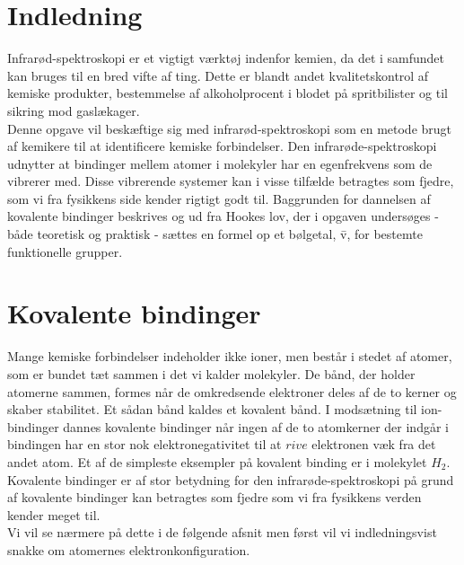 \chapter*{Indledning}
Infrarød-spektroskopi er et vigtigt værktøj indenfor kemien, da det i samfundet kan bruges til en bred vifte af ting. Dette er blandt andet kvalitetskontrol af kemiske produkter, bestemmelse af alkoholprocent i blodet på spritbilister og til sikring mod gaslækager. 
\\

Denne opgave vil beskæftige sig med infrarød-spektroskopi som en metode brugt af kemikere til at identificere kemiske forbindelser. Den infrarøde-spektroskopi udnytter at bindinger mellem atomer i molekyler har en egenfrekvens som de vibrerer med. Disse vibrerende systemer kan i visse tilfælde betragtes som fjedre, som vi fra fysikkens side kender rigtigt godt til. Baggrunden for dannelsen af kovalente bindinger beskrives og ud fra Hookes lov, der i opgaven undersøges - både teoretisk og praktisk - sættes en formel op et bølgetal, \={v}, for bestemte funktionelle grupper.


\chapter{Kovalente bindinger}
Mange kemiske forbindelser indeholder ikke ioner, men består i stedet af atomer, som er bundet tæt sammen i det vi kalder molekyler. De bånd, der holder atomerne sammen, formes når de omkredsende elektroner deles af de to kerner og skaber stabilitet. Et sådan bånd kaldes et kovalent bånd. I modsætning til ion-bindinger dannes kovalente bindinger når ingen af de to atomkerner der indgår i bindingen har en stor nok elektronegativitet til at $rive$ elektronen væk fra det andet atom. Et af de simpleste eksempler på kovalent binding er i molekylet $H_2$. Kovalente bindinger er af stor betydning for den infrarøde-spektroskopi på grund af kovalente bindinger kan betragtes som fjedre som vi fra fysikkens verden kender meget til.
\\
Vi vil se nærmere på dette i de følgende afsnit men først vil vi indledningsvist snakke om atomernes elektronkonfiguration. 

